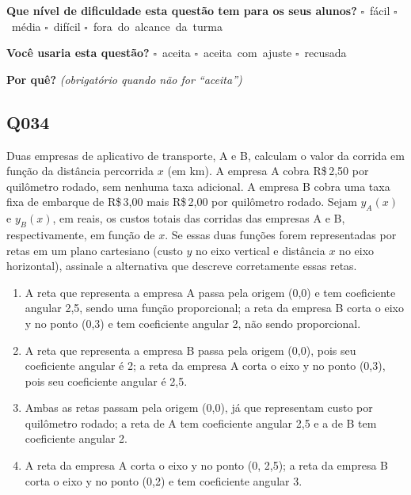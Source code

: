 \documentclass[11pt,a4paper]{article}
\begin{document}
\textbf{Que nível de dificuldade esta questão tem para os seus alunos?}\quad
\mbox{$\square$~fácil} \quad \mbox{$\square$~média} \quad
\mbox{$\square$~difícil} \quad \mbox{$\square$~fora do alcance da turma}

\textbf{Você usaria esta questão?}\quad
\mbox{$\square$~aceita} \quad \mbox{$\square$~aceita com ajuste} \quad
\mbox{$\square$~recusada}

\textbf{Por quê?} \emph{(obrigatório quando não for ``aceita'')}

\underline{\hspace{\linewidth}}

\underline{\hspace{\linewidth}}
\vspace{0.6em}

\begin{samepage}
\subsection*{Q034}
Duas empresas de aplicativo de transporte, A e B, calculam o valor da corrida em função da distância percorrida $x$ (em km). A empresa A cobra R\$\,2,50 por quilômetro rodado, sem nenhuma taxa adicional. A empresa B cobra uma taxa fixa de embarque de R\$\,3,00 mais R\$\,2,00 por quilômetro rodado. Sejam $y_A(x)$ e $y_B(x)$, em reais, os custos totais das corridas das empresas A e B, respectivamente, em função de $x$. Se essas duas funções forem representadas por retas em um plano cartesiano (custo $y$ no eixo vertical e distância $x$ no eixo horizontal), assinale a alternativa que descreve corretamente essas retas.
\begin{enumerate}[label=(\alph*),nosep,leftmargin=*]
\item A reta que representa a empresa A passa pela origem (0,0) e tem coeficiente angular 2,5, sendo uma função proporcional; a reta da empresa B corta o eixo y no ponto (0,3) e tem coeficiente angular 2, não sendo proporcional.
\item A reta que representa a empresa B passa pela origem (0,0), pois seu coeficiente angular é 2; a reta da empresa A corta o eixo y no ponto (0,3), pois seu coeficiente angular é 2,5.
\item Ambas as retas passam pela origem (0,0), já que representam custo por quilômetro rodado; a reta de A tem coeficiente angular 2,5 e a de B tem coeficiente angular 2.
\item A reta da empresa A corta o eixo y no ponto (0, 2,5); a reta da empresa B corta o eixo y no ponto (0,2) e tem coeficiente angular 3.
\end{enumerate}


\end{samepage}
\end{document}
